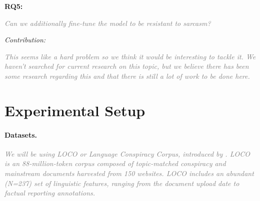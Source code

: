 \documentclass[11pt, a4paper]{article}
\newif\ifinstructions
\newcommand{\explain}[1]{%
  \ifinstructions
    \par\vspace{2pt}%
    {\small\color{exgray} #1}%
    \par\vspace{2pt}%
  \fi
}
\newcommand{\example}[1]{%
  \ifinstructions
    \par\vspace{1pt}%
    {\small\color{exblue} #1}%
    \par\vspace{4pt}%
  \fi
}
\newcommand{\fillhere}[1]{%
  \par\vspace{2pt}%
  \textit{\textcolor{gray}{#1}}%
  \par\vspace{2pt}%
}
\begin{document}
{\noindent\textbf{RQ5:} \fillhere{
Can we additionally fine-tune the model to be resistant to sarcasm?
}
\textit{Contribution:} \fillhere{
 This seems like a hard problem so we think it would be interesting to tackle it. We haven't searched for current research on this topic, but we believe there has been some research regarding this and that there is still a lot of work to be done here.
}


\section{Experimental Setup}

\explain{Briefly describe your experimental plan across the four areas below. Each choice must be \textbf{justified} with respect to your RQs. For example,  saying ``we will use BERT'' without explaining why teaches nothing. This section should be concrete enough to show the pipeline is feasible, but you do not need a full methods section. Close with a short paragraph on risks.}

\paragraph{Datasets.}
\explain{What data will you use? Is it publicly available? Describe its key characteristics (size, domain, language, annotation scheme). If you plan to collect or synthesize data, briefly explain how.}
\example{``We will use the WikiAnn dataset \citep{pan2017wikiann}, which provides NER annotations for 176 languages including all seven target Slavic languages. It is publicly available, large-scale, and has been used as a standard benchmark in prior cross-lingual transfer work \citep{hu2020xtreme, lauscher2020zero}, making our results directly comparable.''}
\fillhere{We will be using \textit{LOCO or Language Conspiracy Corpus}, introduced by \citep{miani2022loco}. \textit{LOCO} is an 88-million-token corpus composed of topic-matched conspiracy and mainstream documents harvested from 150 websites. LOCO includes an abundant (N=237) set of linguistic features, ranging from the document upload date to factual reporting annotations. }

}
\end{document}
